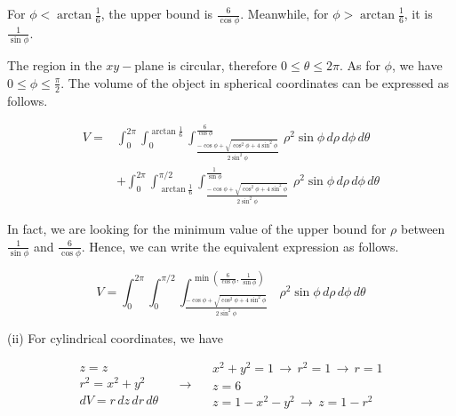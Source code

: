 \documentclass{article}
\begin{document}
\hfill

\noindent For $\displaystyle\phi<\arctan\frac16$, the upper bound is $\displaystyle \frac6{\cos\phi}$. Meanwhile, for $\displaystyle\phi>\arctan\frac16$, it is $\displaystyle \frac1{\sin\phi}$.

\hfill

\noindent The region in the $xy-$plane is circular, therefore $0\leq\theta\leq2\pi$. As for $\phi$, we have $\displaystyle0\leq\phi\leq\frac{\pi}2$. The volume of the object in spherical coordinates can be expressed as follows.

\begin{equation*}
\boxed{\begin{array}{cc}
V=&\displaystyle\int_0^{2\pi}\int_0^{\arctan{\textstyle\frac16}}\int_{\textstyle\frac{-\cos\phi +\sqrt{\cos^2\phi+4\sin^2\phi}}{2\sin^2\phi}}^{\textstyle\frac6{\cos\phi}}\,\rho^2\sin\phi\,d\rho\,d\phi\,d\theta\\
&\displaystyle+\int_0^{2\pi}\int_{\arctan{\textstyle\frac16}}^{\pi/2}\int_{\textstyle\frac{-\cos\phi +\sqrt{\cos^2\phi+4\sin^2\phi}}{2\sin^2\phi}}^{\textstyle\frac1{\sin\phi}}\,\rho^2\sin\phi\,d\rho\,d\phi\,d\theta 
\end{array}}
\end{equation*}

\hfill

\noindent In fact, we are looking for the minimum value of the upper bound for $\rho$ between $\displaystyle\frac1{\sin\phi}$ and $\displaystyle\frac6{\cos\phi}$. Hence, we can write the equivalent expression as follows.

\begin{equation*}
\boxed{V=\displaystyle\int_0^{2\pi}\int_0^{\pi/2}\int_{\textstyle\frac{-\cos\phi +\sqrt{\cos^2\phi+4\sin^2\phi}}{2\sin^2\phi}}^{\min\left(\textstyle\frac6{\cos\phi},\frac1{\sin\phi}\right)}\,\rho^2\sin\phi\,d\rho\,d\phi\,d\theta}
\end{equation*}

\hfill

\noindent (ii) For cylindrical coordinates, we have

\[
\begin{array}{c}
z=z\\
r^2=x^2+y^2\\
dV=r\,dz\,dr\,d\theta
\end{array}\quad\rightarrow\quad
\begin{array}{c}
x^2+y^2=1\,\rightarrow\,r^2 = 1\,\rightarrow\,r=1\\
z=6\\
z=1-x^2-y^2\,\rightarrow\,z=1-r^2
\end{array}
\]
\end{document}
